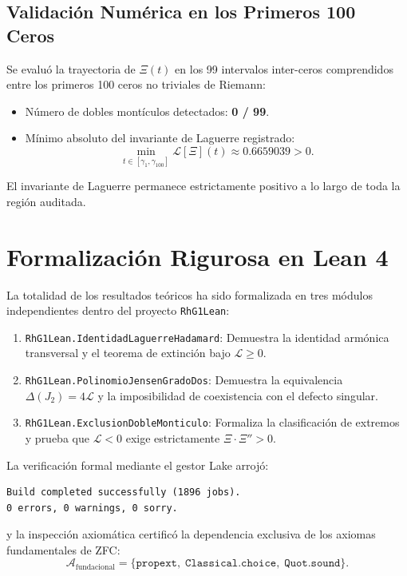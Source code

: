 \documentclass[11pt,a4paper]{article}
\theoremstyle{definition}
\theoremstyle{remark}
\begin{document}
\subsection{Validación Numérica en los Primeros 100 Ceros}

Se evaluó la trayectoria de $\Xi(t)$ en los 99 intervalos inter-ceros comprendidos entre los primeros 100 ceros no triviales de Riemann:
\begin{itemize}
    \item Número de dobles montículos detectados: \textbf{0 / 99}.
    \item Mínimo absoluto del invariante de Laguerre registrado:
    \begin{equation}
    \min_{t \in [\gamma_1, \gamma_{100}]} \mathcal{L}[\Xi](t) \approx 0.6659039 > 0.
    \end{equation}
\end{itemize}
El invariante de Laguerre permanece estrictamente positivo a lo largo de toda la región auditada.

\section{Formalización Rigurosa en Lean 4}

La totalidad de los resultados teóricos ha sido formalizada en tres módulos independientes dentro del proyecto \texttt{RhG1Lean}:
\begin{enumerate}
    \item \texttt{RhG1Lean.IdentidadLaguerreHadamard}: Demuestra la identidad armónica transversal y el teorema de extinción bajo $\mathcal{L} \ge 0$.
    \item \texttt{RhG1Lean.PolinomioJensenGradoDos}: Demuestra la equivalencia $\Delta(J_2) = 4\mathcal{L}$ y la imposibilidad de coexistencia con el defecto singular.
    \item \texttt{RhG1Lean.ExclusionDobleMonticulo}: Formaliza la clasificación de extremos y prueba que $\mathcal{L} < 0$ exige estrictamente $\Xi \cdot \Xi'' > 0$.
\end{enumerate}

La verificación formal mediante el gestor Lake arrojó:
\begin{verbatim}
Build completed successfully (1896 jobs).
0 errors, 0 warnings, 0 sorry.
\end{verbatim}
y la inspección axiomática certificó la dependencia exclusiva de los axiomas fundamentales de ZFC:
\begin{equation}
\mathcal{A}_{\text{fundacional}} = \{\texttt{propext}, \; \texttt{Classical.choice}, \; \texttt{Quot.sound}\}.
\end{equation}
\end{document}

